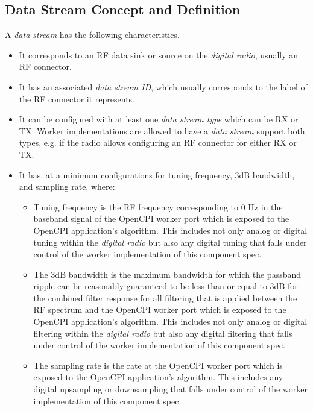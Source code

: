 \documentclass{article}
\begin{document}
  \subsection{Data Stream Concept and Definition}
    A \textit{data stream} has the following characteristics.
    \begin{itemize}
      \item It corresponds to an RF data sink or source on the
            \textit{digital radio},
            usually an RF connector.
      \item It has an associated \textit{data stream ID}, which usually
            corresponds to the
            label of the RF connector it represents.
      \item It can be configured with at least one \textit{data stream type}
            which can be RX or TX. Worker implementations are allowed to have a
            \textit{data stream} support both types, e.g. if the radio allows
            configuring an RF connector for either RX or TX.
      \item It has, at a minimum configurations for tuning frequency, 3dB bandwidth,
            and sampling rate, where:
      \begin{itemize}
        \item Tuning frequency is the RF frequency corresponding to 0 Hz in the
              baseband signal of the OpenCPI worker port which is exposed to
              the OpenCPI application's algorithm. This includes not only
              analog or digital tuning within the \textit{digital radio} but
              also any digital tuning that falls under control of the worker
              implementation of this component spec.
        \item The 3dB bandwidth is the maximum bandwidth for which the passband
              ripple can be reasonably guaranteed to be less than or equal to
              3dB for the combined filter response for all filtering that is
              applied between the RF spectrum and the OpenCPI worker port
              which is exposed to the OpenCPI application's algorithm. This
              includes not only analog or digital filtering within the
              \textit{digital radio} but also any digital filtering that falls
              under control of the worker implementation of this component spec.
        \item The sampling rate is the rate at the OpenCPI worker port which
              is exposed to the OpenCPI application's algorithm. This includes
              any digital upsampling or downsampling that falls under control of
              the worker
              implementation of this component spec.
      \end{itemize}
    \end{itemize}
\end{document}
